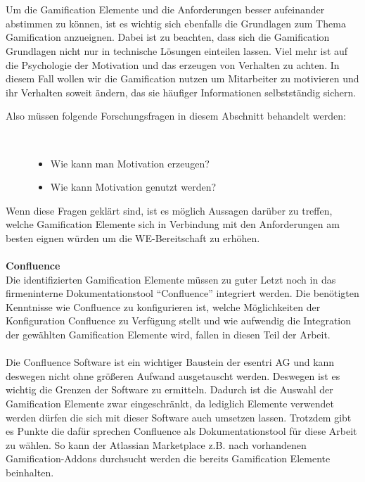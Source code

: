 \documentclass[a4paper,12pt,twoside]{scrartcl}
\begin{document}
\\\\
Um die Gamification Elemente und die Anforderungen besser aufeinander abstimmen zu können, ist es wichtig sich ebenfalls die Grundlagen zum Thema Gamification anzueignen. Dabei ist zu beachten, dass sich die Gamification Grundlagen nicht nur in technische Lösungen einteilen lassen. Viel mehr ist auf die Psychologie der Motivation und das erzeugen von Verhalten zu achten. In diesem Fall wollen wir die Gamification nutzen um Mitarbeiter zu motivieren und ihr Verhalten soweit ändern, das sie häufiger Informationen selbstständig sichern.
\begin{description}
   \item[Also müssen folgende Forschungsfragen in diesem Abschnitt behandelt werden:]~\par
   \begin{itemize}
      \item Wie kann man Motivation erzeugen?
      \item Wie kann Motivation genutzt werden?
   \end{itemize}
\end{description}
Wenn diese Fragen geklärt sind, ist es möglich Aussagen darüber zu treffen, welche Gamification Elemente sich in Verbindung mit den Anforderungen am besten eignen würden um die WE-Bereitschaft zu erhöhen.
\\\\
\textbf{Confluence}\\
Die identifizierten Gamification Elemente müssen zu guter Letzt noch in das firmeninterne Dokumentationstool \enquote{Confluence} integriert werden. Die benötigten Kenntnisse wie Confluence zu konfigurieren ist, welche Möglichkeiten der Konfiguration Confluence zu Verfügung stellt und wie aufwendig die Integration der gewählten Gamification Elemente wird, fallen in diesen Teil der Arbeit. 
\\\\
Die Confluence Software ist ein wichtiger Baustein der esentri AG und kann deswegen nicht ohne größeren Aufwand ausgetauscht werden. Deswegen ist es wichtig die Grenzen der Software zu ermitteln. Dadurch ist die Auswahl der Gamification Elemente zwar eingeschränkt, da lediglich Elemente verwendet werden dürfen die sich mit dieser Software auch umsetzen lassen. Trotzdem gibt es Punkte die dafür sprechen Confluence als Dokumentationstool für diese Arbeit zu wählen. So kann der Atlassian Marketplace z.B. nach vorhandenen Gamification-Addons durchsucht werden die bereits Gamification Elemente beinhalten.
\end{document}
